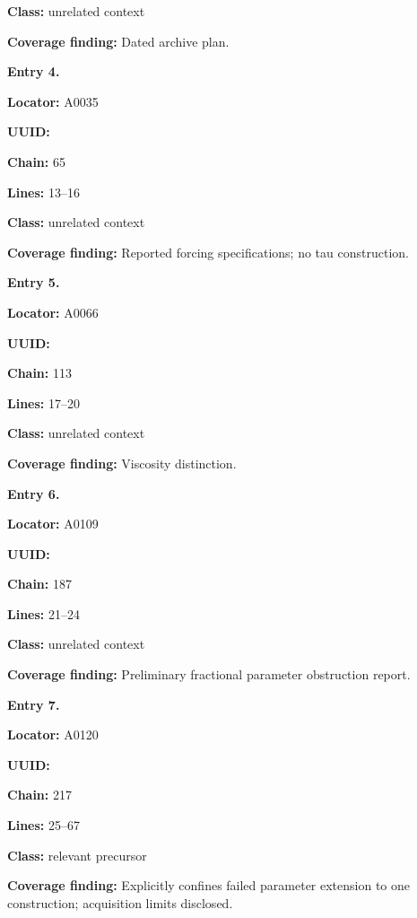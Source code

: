 \textbf{Class:} unrelated context

\textbf{Coverage finding:} Dated archive plan.


\textbf{Entry 4.}

\textbf{Locator:} A0035

\textbf{UUID:} \protect{}

\textbf{Chain:} 65

\textbf{Lines:} 13--16

\textbf{Class:} unrelated context

\textbf{Coverage finding:} Reported forcing specifications; no tau
construction.


\textbf{Entry 5.}

\textbf{Locator:} A0066

\textbf{UUID:} \protect{}

\textbf{Chain:} 113

\textbf{Lines:} 17--20

\textbf{Class:} unrelated context

\textbf{Coverage finding:} Viscosity distinction.


\textbf{Entry 6.}

\textbf{Locator:} A0109

\textbf{UUID:} \protect{}

\textbf{Chain:} 187

\textbf{Lines:} 21--24

\textbf{Class:} unrelated context

\textbf{Coverage finding:} Preliminary fractional parameter obstruction
report.


\textbf{Entry 7.}

\textbf{Locator:} A0120

\textbf{UUID:} \protect{}

\textbf{Chain:} 217

\textbf{Lines:} 25--67

\textbf{Class:} relevant precursor

\textbf{Coverage finding:} Explicitly confines failed parameter
extension to one construction; acquisition limits disclosed.

